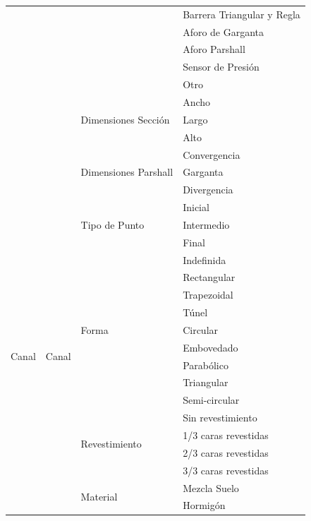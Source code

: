 \documentclass[]{article}
\begin{document}
\begin{longtable}{|p{3cm}|p{3.5cm}|p{3.5cm}|p{3.5cm}|}
    \cline{4-4}
    & & & Barrera Triangular y Regla\\
    \cline{4-4}
    & & & Aforo de Garganta\\
    \cline{4-4}
    & & & Aforo Parshall\\
    \cline{4-4}
    & & & Sensor de Presión\\
    \cline{4-4}
    & & & Otro\\
    \cline{3-4}
    & & \multirow {3}{3.5cm}{Dimensiones Sección} & Ancho\\
    \cline{4-4}
    & & & Largo\\
    \cline{4-4}
    & & & Alto\\
    \cline{3-4}
    & & \multirow {3}{3.5cm}{Dimensiones Parshall} & Convergencia\\
    \cline{4-4}
    & & & Garganta\\
    \cline{4-4}
    & & & Divergencia\\ 
    \hline   
    \multirow {34}{3cm}{Canal} & \multirow {34}{3.5cm}{Canal} & \multirow {3}{3.5cm}{Tipo de Punto} &  Inicial\\
	\cline{4-4}
	& & & Intermedio\\
	\cline{4-4}
	& & & Final\\
    \cline{3-4}
    & & \multirow {9}{3.5cm}{Forma} & Indefinida\\
    \cline{4-4}
    & & & Rectangular\\
    \cline{4-4}
    & & & Trapezoidal\\
    \cline{4-4}
    & & & Túnel\\
    \cline{4-4}
    & & & Circular\\
    \cline{4-4}
    & & & Embovedado\\
    \cline{4-4}
    & & & Parabólico\\
    \cline{4-4}
    & & & Triangular\\
    \cline{4-4}
    & & & Semi-circular\\
    \cline{3-4}
	& & \multirow {4}{3.5cm}{Revestimiento} & Sin revestimiento\\
    \cline{4-4}
    & & & 1/3 caras revestidas\\
    \cline{4-4}
    & & & 2/3 caras revestidas\\
    \cline{4-4}
    & & & 3/3 caras revestidas\\
    \cline{3-4}  
    & & \multirow {20}{3.5cm}{Material} & Mezcla Suelo\\
    \cline{4-4}
    & & & Hormigón\\
    \cline{4-4}

\end{longtable}
\end{document}
